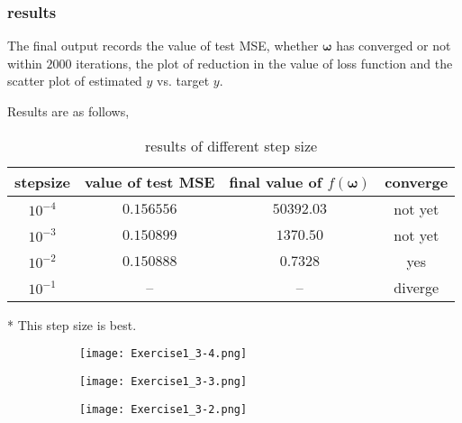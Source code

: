 \documentclass[a4paper,11pt]{article}
\begin{document}
\subsubsection*{results}
The final output records the value of test MSE, whether $\bm{\omega}$ has converged or not within $2000$ iterations, the plot of reduction in the value of loss function and the scatter plot of estimated $\hat{y}$ vs. target $y$.\par
Results are as follows,\\ 
\begin{table}[H]
	\begin{center}
		\begin{threeparttable}
			\centering \caption{results of different step size}
			\begin{tabular}{cccc}
				\toprule[2pt]
				stepsize&value of test MSE&final value of $f(\bm{\omega})$ & converge\\
				\hline
				$10^{-4}$&$0.156556$	&$50392.03$	&not yet\\
				$10^{-3}$&$0.150899$	&$1370.50$	&not yet\\
				$10^{-2}${\tnote{*}}&$0.150888$	&$0.7328$	&yes	\\
				$10^{-1}$&--			&--			& diverge    \\
				\bottomrule[2pt]
			\end{tabular} 
			\begin{tablenotes}
				\item[*] This step size is best.
			\end{tablenotes}
		\end{threeparttable}
	\end{center}
\end{table}
\par
\begin{figure}[H]
	\centering
	\begin{subfigure}[t]{0.2\textwidth}
		\centering
		\texttt{[image: Exercise1\_3-4.png]}
	\end{subfigure}
	\quad
	\begin{subfigure}[t]{0.2\textwidth}
		\centering
		\texttt{[image: Exercise1\_3-3.png]}
	\end{subfigure}
	\quad
	\begin{subfigure}[t]{0.2\textwidth}
		\centering
		\texttt{[image: Exercise1\_3-2.png]}
	\end{subfigure}
\end{figure}
\par
\end{document}
